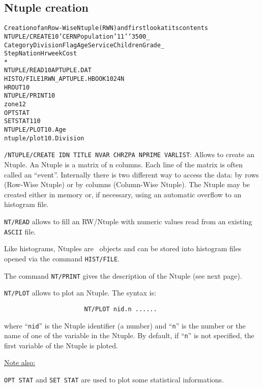 \subsection{Ntuple creation}
\begin{alltt}
{Creation of an Row-Wise Ntuple (RWN) and first look at its contents}
     NTUPLE/CREATE 10 'CERN Population' 11 ' ' 3500  _
      Category Division Flag Age Service Children Grade _
      Step Nation Hrweek Cost
      *
     NTUPLE/READ 10 APTUPLE.DAT
     HISTO/FILE 1 RWN_APTUPLE.HBOOK 1024 N
     HROUT 10
     NTUPLE/PRINT 10
      zone 1 2
     OPT STAT
     SET STAT 110
     NTUPLE/PLOT 10.Age
      ntuple/plot 10.Division
\end{alltt} 
\begin{DinglistE}
\item {\tt /NTUPLE/CREATE  IDN TITLE NVAR CHRZPA NPRIME VARLIST}:
      Allows to create an Ntuple. An Ntuple is a matrix of n columns. Each
      line of the matrix is often called an ``event''. Internally there is
      two different way to access the data: by rows (Row-Wise Ntuple) or
      by columns (Column-Wise Ntuple). The Ntuple may be
      created either in memory or, if necessary, using an automatic overflow
      to an histogram file.
\item {\tt NT/READ} allows to fill an RW/Ntuple with numeric values read
      from an existing {\tt ASCII} file.
\item Like histograms, Ntuples are \HBOOK\ objects and can be stored into
      histogram files opened via the command {\tt HIST/FILE}.
\item The command {\tt NT/PRINT} gives the description of the 
      Ntuple (see next page).
\item {\tt NT/PLOT} allows to plot an Ntuple. The syntax is:
\begin{verbatim}
                      NT/PLOT nid.n ......
\end{verbatim}
      where ``{\tt nid}'' is the Ntuple identifier
      (a number) and ``{\tt n}'' is the number or the name of one of the
      variable in the Ntuple. By default, if ``{\tt n}'' is not specified,
      the first variable of the Ntuple is ploted.

\underline{Note also:}

\item {\tt OPT STAT} and {\tt SET STAT} are used to plot some
      statistical informations.
\end{DinglistE}
\clearpage
